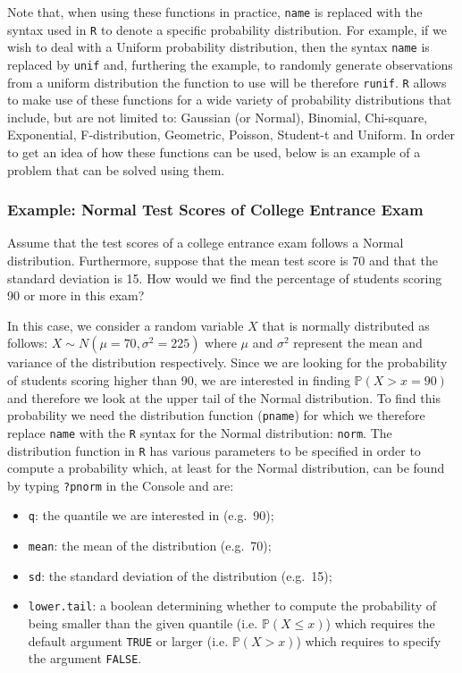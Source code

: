\documentclass[12pt,]{krantz}
\providecommand{\tightlist}{%
  \setlength{\itemsep}{0pt}\setlength{\parskip}{0pt}}
\begin{document}
Note that, when using these functions in practice, \texttt{name} is
replaced with the syntax used in \texttt{R} to denote a specific
probability distribution. For example, if we wish to deal with a Uniform
probability distribution, then the syntax \texttt{name} is replaced by
\texttt{unif} and, furthering the example, to randomly generate
observations from a uniform distribution the function to use will be
therefore \texttt{runif}. \texttt{R} allows to make use of these
functions for a wide variety of probability distributions that include,
but are not limited to: Gaussian (or Normal), Binomial, Chi-square,
Exponential, F-distribution, Geometric, Poisson, Student-t and Uniform.
In order to get an idea of how these functions can be used, below is an
example of a problem that can be solved using them.

\subsubsection{Example: Normal Test Scores of College Entrance
Exam}\label{example-normal-test-scores-of-college-entrance-exam}

Assume that the test scores of a college entrance exam follows a Normal
distribution. Furthermore, suppose that the mean test score is 70 and
that the standard deviation is 15. How would we find the percentage of
students scoring 90 or more in this exam?

In this case, we consider a random variable \(X\) that is normally
distributed as follows: \(X \sim N(\mu=70, \sigma^2=225)\) where \(\mu\)
and \(\sigma^2\) represent the mean and variance of the distribution
respectively. Since we are looking for the probability of students
scoring higher than 90, we are interested in finding
\(\mathbb{P}(X > x=90)\) and therefore we look at the upper tail of the
Normal distribution. To find this probability we need the distribution
function (\texttt{pname}) for which we therefore replace \texttt{name}
with the \texttt{R} syntax for the Normal distribution: \texttt{norm}.
The distribution function in \texttt{R} has various parameters to be
specified in order to compute a probability which, at least for the
Normal distribution, can be found by typing \texttt{?pnorm} in the
Console and are:

\begin{itemize}
\tightlist
\item
  \texttt{q}: the quantile we are interested in (e.g.~90);
\item
  \texttt{mean}: the mean of the distribution (e.g.~70);
\item
  \texttt{sd}: the standard deviation of the distribution (e.g.~15);
\item
  \texttt{lower.tail}: a boolean determining whether to compute the
  probability of being smaller than the given quantile (i.e.
  \(\mathbb{P}(X \leq x)\)) which requires the default argument
  \texttt{TRUE} or larger (i.e. \(\mathbb{P}(X > x)\)) which requires to
  specify the argument \texttt{FALSE}.
\end{itemize}
\end{document}
